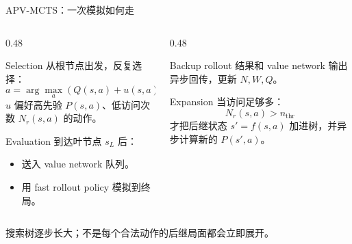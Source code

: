 \documentclass[UTF8,aspectratio=169,10pt]{ctexbeamer}
\begin{document}
\begin{frame}{APV-MCTS：一次模拟如何走}
  \begin{columns}[T,onlytextwidth]
    \begin{column}{0.48\textwidth}
      \begin{block}{Selection}
        从根节点出发，反复选择：
        \[
          a=\arg\max_a(Q(s,a)+u(s,a))
        \]
        \footnotesize
        $u$ 偏好高先验 $P(s,a)$、低访问次数 $N_r(s,a)$ 的动作。
      \end{block}

      \begin{block}{Evaluation}
        到达叶节点 $s_L$ 后：
        \begin{itemize}
          \item 送入 value network 队列。
          \item 用 fast rollout policy 模拟到终局。
        \end{itemize}
      \end{block}
    \end{column}
    \begin{column}{0.48\textwidth}
      \begin{block}{Backup}
        rollout 结果和 value network 输出异步回传，更新 $N,W,Q$。
      \end{block}

      \begin{block}{Expansion}
        当访问足够多：
        \[
          N_r(s,a)>n_{\mathrm{thr}}
        \]
        才把后继状态 $s'=f(s,a)$ 加进树，并异步计算新的 $P(s',a)$。
      \end{block}
    \end{column}
  \end{columns}

  \vspace{0.12cm}
  \begin{center}
    \small
    搜索树逐步长大；不是每个合法动作的后继局面都会立即展开。
  \end{center}
\end{frame}
\end{document}
